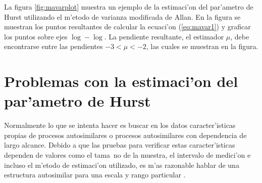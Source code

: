 La figura \ref{fig:mavarplot} muestra un ejemplo de la estimaci'on del 
par'ametro de Hurst utilizando el m'etodo de varianza modificada de Allan. En la
figura se muestran los puntos resultantes de calcular la ecuaci'on 
(\ref{eq:mavar1}) y graficar los puntos sobre ejes $\log - \log$. La pendiente
resultante, el estimador $\mu$, debe encontrarse entre las pendientes
$-3 < \mu < -2$, las cuales se muestran en la figura.

\section{Problemas con la estimaci'on del par'ametro de Hurst}
\label{sect:problemashurst}

Normalmente lo que se intenta hacer es buscar en los datos caracter'isticas
propias de procesos autosimilares o procesos autosimilares con dependencia de
largo alcance. Debido a que las pruebas para verificar estas caracter'isticas
dependen de valores como el tama~no de la muestra, el intervalo de medici'on e
incluso el m'etodo de estimaci'on utilizado, es m'as razonable hablar de una
estructura autosimilar para una escala y rango particular
\cite{Karagiannis02long-rangedependence:} \cite{Molnar_bottleneckson}.


